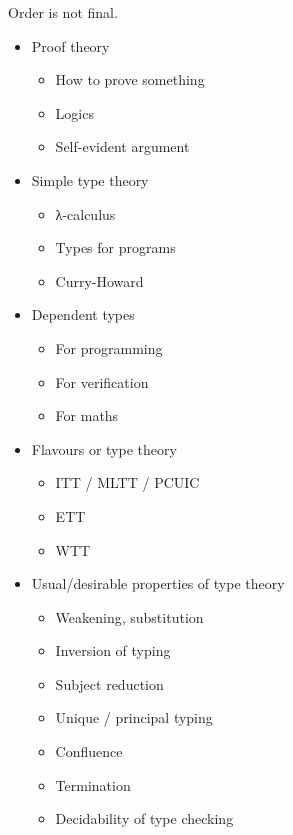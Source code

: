 Order is not final.


\begin{itemize}
  \item Proof theory
    \begin{itemize}
      \item How to prove something
      \item Logics
      \item Self-evident argument
    \end{itemize}
  \item Simple type theory
    \begin{itemize}
      \item λ-calculus
      \item Types for programs
      \item Curry-Howard
    \end{itemize}
  \item Dependent types
    \begin{itemize}
      \item For programming
      \item For verification
      \item For maths
    \end{itemize}
  \item Flavours or type theory
    \begin{itemize}
      \item ITT / MLTT / PCUIC
      \item ETT
      \item WTT
    \end{itemize}
  \item Usual/desirable properties of type theory
    \begin{itemize}
      \item Weakening, substitution
      \item Inversion of typing
      \item Subject reduction
      \item Unique / principal typing
      \item Confluence
      \item Termination
      \item Decidability of type checking

\end{itemize}
\end{itemize}
